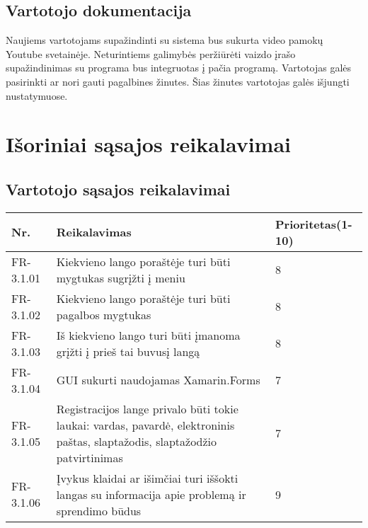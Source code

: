 \documentclass[oneside]{VUMIFPSkursinis}
\begin{document}
\subsection{Vartotojo dokumentacija}
Naujiems vartotojams supažindinti su sistema bus sukurta video pamokų Youtube svetainėje. Neturintiems galimybės peržiūrėti vaizdo įrašo supažindinimas su programa bus integruotas į pačia programą. Vartotojas galės pasirinkti ar nori gauti pagalbines žinutes. Šias žinutes vartotojas galės išjungti nustatymuose. 

\section{Išoriniai sąsajos reikalavimai}
\subsection{Vartotojo sąsajos reikalavimai}
\begin{table}[htbp]
	\begin{tabularx}{1\textwidth}{ |P{2.5cm}|X|P{3cm }| }  \hline
		Nr. & Reikalavimas & Prioritetas(1-10) \\ \hline
		FR-3.1.01 & Kiekvieno lango poraštėje turi būti mygtukas sugrįžti į meniu & 8 \\ \hline
		FR-3.1.02 & Kiekvieno lango poraštėje turi būti pagalbos mygtukas & 8 \\ \hline
		FR-3.1.03 & Iš kiekvieno lango turi būti įmanoma grįžti į prieš tai buvusį langą & 8 \\ \hline
		FR-3.1.04 & GUI sukurti naudojamas Xamarin.Forms & 7 \\ \hline
		FR-3.1.05 & Registracijos lange privalo būti tokie laukai: vardas, pavardė, elektroninis paštas, slaptažodis, slaptažodžio patvirtinimas & 7 \\ \hline
		FR-3.1.06 & Įvykus klaidai ar išimčiai turi iššokti langas su informacija apie problemą ir sprendimo būdus & 9 \\ \hline
	\end{tabularx}
\end{table}
\end{document}
